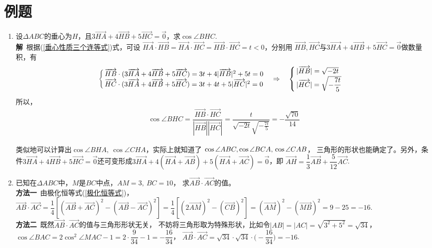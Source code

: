 \section{例题}

\begin{enumerate}[label={【\textbf{例\thechapter.\arabic*}】},
 leftmargin=\inteval{\myenumleftmargin}pt,
 itemsep=\inteval{\myenumitempsep}pt,
 itemindent=\inteval{\myenumitemindent}pt]
\item 设$ \Delta ABC $的垂心为$ H $，且$ 3\vec{HA}+4\vec{HB}
+5\vec{HC}=\vec{0} $，求$ \cos\angle BHC $. \\
\textbf{解}\ 根据(\ref{垂心性质三个连等式})式，可设 $ \vec{HA}\cdot
\vec{HB}=\vec{HA}
\cdot\vec{HC}=\vec{HB}\cdot \vec{HC}=t<0 $，分别用
$ \vec{HB},\vec{HC} $与$ 3\vec{HA}+
4\vec{HB} +5\vec{HC}=\vec{0} $做数量积，有
\begin{gather*}
    \begin{cases}
        \overrightarrow{HB}\cdot (3\overrightarrow{HA}+4\overrightarrow{HB} +5\overrightarrow{HC})=
        3t+4|\overrightarrow{HB}|^2+5t= 0 \\
        \overrightarrow{HC}\cdot (3\overrightarrow{HA}+4\overrightarrow{HB} +5\overrightarrow{HC})=
        3t+4t+5|\overrightarrow{HC}|^2= 0 
    \end{cases} \Rightarrow \quad 
    \begin{cases}
        |\overrightarrow{HB}|=\sqrt{-2t}\\
        |\overrightarrow{HC}|=\sqrt{-\dfrac{7t}{5}}
    \end{cases}
\end{gather*}
所以，
\begin{gather*}
    \cos\angle BHC=\dfrac{\vec{HB}\cdot \vec{HC}}
    {|\vec{HB}||\vec{HC}|}=\dfrac{t}{\sqrt{-2t}\sqrt{-\frac{7t}{5}}}
    =-\dfrac{\sqrt{70}}{14} 
\end{gather*}

类似地可以计算出$ \cos\angle BHA,\ \cos\angle CHA $，实际上就知道了
$ \cos\angle ABC,\cos\angle BCA,\\ \cos\angle CAB $，
三角形的形状也能确定了。另外，条件$ 3\vec{HA}+4\vec{HB}
+5\vec{HC}=\vec{0} $还可变形成$ 3\vec{HA}+4(\vec{HA}+\vec{AB})
+5(\vec{HA}+\vec{AC})=\vec{0} $，即
$ \vec{AH}=\dfrac{1}{3}\vec{AB}+\dfrac{5}{12}\vec{AC}$.

\item 已知在$ \Delta ABC $中，$ M $是$ BC $中点，$ AM=3,\ BC=10 $，
求$ \vec{AB}\cdot \vec{AC} $的值。\\
\textbf{方法一}\ 由极化恒等式(\ref{极化恒等式})，$ \vec{AB}\cdot 
\vec{AC}=\dfrac{1}{4}[(\vec{AB}+\vec{AC})^2-
(\vec{AB}-\vec{AC})^2]=\dfrac{1}{4}[(2\vec{AM})^2-
(\vec{CB})^2]=(\vec{AM})^2-(\vec{MB})^2=9-25=-16 $. \\
\textbf{方法二}\ 既然$ \vec{AB}\cdot \vec{AC} $的值与三角形形状无关，
不妨将三角形取为特殊形状，比如令$ |AB|=|AC|=\sqrt{3^2+5^2}=\sqrt{34} $，
$ \cos\angle BAC=2\cos^2\angle MAC-1=2\cdot \dfrac{9}{34}-1=-\dfrac{16}{34} $，
$ \vec{AB}\cdot \vec{AC}=\sqrt{34}\cdot \sqrt{34}\cdot
\Big(-\dfrac{16}{34}\Big)=-16 $.


\end{enumerate}
